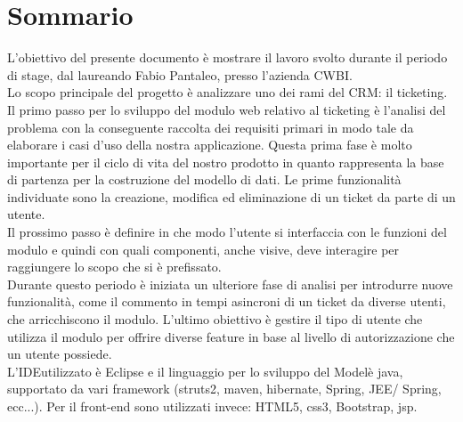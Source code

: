 \cleardoublepage
{}
{}
\begingroup
\let\clearpage\relax
\let\cleardoublepage\relax
\let\cleardoublepage\relax

\chapter*{Sommario}

L'obiettivo del presente documento è mostrare il lavoro svolto durante il periodo di stage, dal laureando Fabio Pantaleo, presso l'azienda CWBI. \\
Lo scopo principale del progetto è analizzare uno dei rami del CRM\glsfirstoccur \;: il ticketing\glsfirstoccur. \\
Il primo passo per lo sviluppo del modulo web relativo al ticketing è l'analisi del problema con la conseguente raccolta dei requisiti primari in modo tale da elaborare i casi d'uso della nostra applicazione. Questa prima fase è molto importante per il ciclo di vita del nostro prodotto in quanto rappresenta la base di partenza per la costruzione del modello di dati.
Le prime funzionalità individuate sono la creazione, modifica ed eliminazione di un ticket da parte di un utente.  \\
Il prossimo passo è definire in che modo l'utente si interfaccia con le funzioni del modulo e quindi con quali componenti, anche visive, deve interagire per raggiungere lo scopo che si è prefissato.\\ 
Durante questo periodo è iniziata un ulteriore fase di analisi per introdurre nuove funzionalità, come il commento in tempi asincroni di un ticket da diverse utenti, che arricchiscono il modulo.
L'ultimo obiettivo è gestire il tipo di utente che utilizza il modulo per offrire diverse feature in base al livello di autorizzazione che un utente possiede.\\

\noindent L'IDE\glsfirstoccur \;utilizzato è Eclipse e il linguaggio per lo sviluppo del Model\glsfirstoccur \;è java, supportato da vari framework (struts2, maven, hibernate, Spring, JEE/ Spring, ecc...). Per il front-end sono utilizzati invece: HTML5, css3, Bootstrap, jsp. 




\endgroup

\vfill
